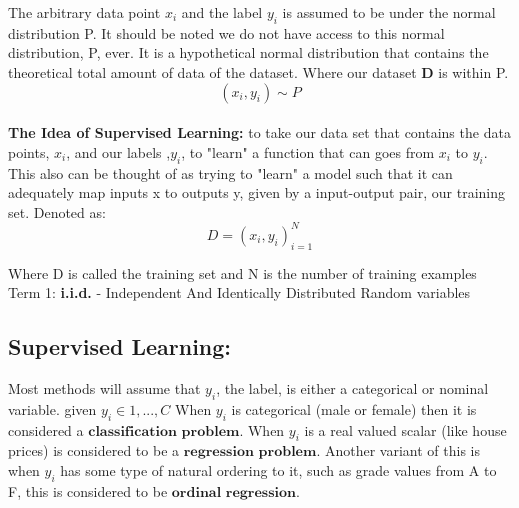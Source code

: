 \documentclass{article}
\begin{document}
    The arbitrary data point $x_{i}$ and the label $y_{i}$ is assumed to be under the normal distribution P. It should be noted we do not have access to this normal distribution, P, ever. It is a hypothetical normal distribution that contains the theoretical total amount of data of the dataset. Where our dataset $\textbf{D}$ is within P.
    \begin{equation}
        (x_{i}, y_{i}) \sim P
    \end{equation} \\
    
    \textbf{The Idea of Supervised Learning:} to take our data set that contains the data points, $x_{i}$, and our labels ,$y_{i}$, to "learn" a function that can goes from $x_{i}$ to $y_{i}$. This also can be thought of as trying to "learn" a model such that it can adequately map  inputs x to outputs y, given by a input-output pair, our training set. Denoted as: \\
    
    \begin{equation}
        D = {(x_{i}, y_{i})}_{i=1}^N
    \end{equation}
    
    Where D is called the training set and N is the number of training examples 
    \\
    
    Term 1: \textbf{i.i.d.} - Independent And Identically Distributed Random variables 
    \\
    
    \subsection{Supervised Learning:}
    Most methods will assume that $y_i$, the label, is either a categorical or nominal variable. given $y_{i} \in {1,..., C}$ When $y_i$ is categorical (male or female) then it is considered a $\textbf{classification problem}$. When $y_i$ is a real valued scalar (like house prices) is considered to be a $\textbf{regression problem}$. Another variant of this is when $y_i$ has some type of natural ordering to it, such as grade values from A to F, this is considered to be $\textbf{ordinal regression}$.   
    
\end{document}
